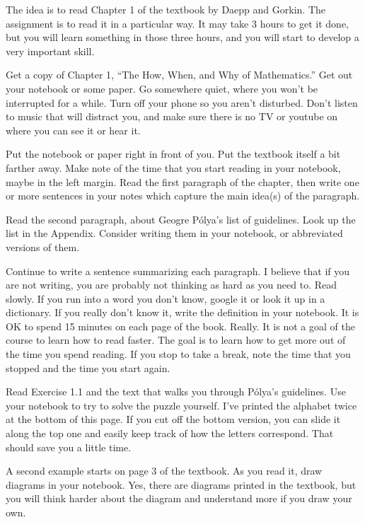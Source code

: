 
The idea is to read Chapter 1 of the textbook by Daepp and Gorkin\DGreference.
The assignment is to read it in a particular way.
It may take 3 hours to get it done, but you will learn something in those three hours, and you will start to develop a very important skill.

Get a copy of Chapter 1, ``The How, When, and Why of Mathematics.''
Get out your notebook or some paper.
Go somewhere quiet, where you won't be interrupted for a while.
Turn off your phone so you aren't disturbed.
Don't listen to music that will distract you, and make sure there is no TV or youtube on where you can see it or hear it.

Put the notebook or paper right in front of you.
Put the textbook itself a bit farther away.
Make note of the time that you start reading in your notebook, maybe in the left margin.
Read the first paragraph of the chapter, then write one or more sentences in your notes which capture the main idea(s) of the paragraph.

Read the second paragraph, about Geogre P\'{o}lya's list of guidelines.
Look up the list in the Appendix.
Consider writing them in your notebook, or abbreviated versions of them.

Continue to write a sentence summarizing each paragraph.
I believe that if you are not writing, you are probably not thinking as hard as you need to.
Read slowly.
If you run into a word you don't know, google it or look it up in a dictionary.  If you really don't know it, write the definition in your notebook.
It is OK to spend 15 minutes on each page of the book.  Really.
It is not a goal of the course to learn how to read faster.
The goal is to learn how to get more out of the time you spend reading.
If you stop to take a break, note the time that you stopped and the time you start again.

Read Exercise 1.1 and the text that walks you through P\'{o}lya's guidelines.
Use your notebook to try to solve the puzzle yourself.
I've printed the alphabet twice at the bottom of this page.  If you cut off the bottom version, you can slide it along the top one and easily keep track of how the letters correspond.  That should save you a little time.

A second example starts on page 3 of the textbook.
As you read it, draw diagrams in your notebook.
Yes, there are diagrams printed in the textbook, but you will think harder about the diagram and understand more if you draw your own.

